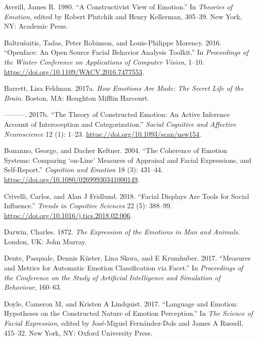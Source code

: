 \documentclass[conference,final,]{IEEEtran}
\begin{document}
\hypertarget{refs}{}
\leavevmode\hypertarget{ref-averill1980constructivist}{}%
Averill, James R. 1980. ``A Constructivist View of Emotion.'' In
\emph{Theories of Emotion}, edited by Robert Plutchik and Henry
Kellerman, 305--39. New York, NY: Academic Press.

\leavevmode\hypertarget{ref-baltruvsaitis2016openface}{}%
Baltrušaitis, Tadas, Peter Robinson, and Louis-Philippe Morency. 2016.
``Openface: An Open Source Facial Behavior Analysis Toolkit.'' In
\emph{Proceedings of the Winter Conference on Applications of Computer
Vision}, 1--10. \url{https://doi.org/10.1109/WACV.2016.7477553}.

\leavevmode\hypertarget{ref-barrett2017emotions}{}%
Barrett, Lisa Feldman. 2017a. \emph{How Emotions Are Made: The Secret
Life of the Brain}. Boston, MA: Houghton Mifflin Harcourt.

\leavevmode\hypertarget{ref-barrett2017theory}{}%
---------. 2017b. ``The Theory of Constructed Emotion: An Active
Inference Account of Interoception and Categorization.'' \emph{Social
Cognitive and Affective Neuroscience} 12 (1): 1--23.
\url{https://doi.org/10.1093/scan/nsw154}.

\leavevmode\hypertarget{ref-bonanno2004brief}{}%
Bonanno, George, and Dacher Keltner. 2004. ``The Coherence of Emotion
Systems: Comparing `on-Line' Measures of Appraisal and Facial
Expressions, and Self-Report.'' \emph{Cognition and Emotion} 18 (3):
431--44. \url{https://doi.org/10.1080/02699930341000149}.

\leavevmode\hypertarget{ref-crivelli2018facial}{}%
Crivelli, Carlos, and Alan J Fridlund. 2018. ``Facial Displays Are Tools
for Social Influence.'' \emph{Trends in Cognitive Sciences} 22 (5):
388--99. \url{https://doi.org/10.1016/j.tics.2018.02.006}.

\leavevmode\hypertarget{ref-darwin1872expression}{}%
Darwin, Charles. 1872. \emph{The Expression of the Emotions in Man and
Animals}. London, UK: John Murray.

\leavevmode\hypertarget{ref-dente2017measures}{}%
Dente, Pasquale, Dennis Küster, Lina Skora, and E Krumhuber. 2017.
``Measures and Metrics for Automatic Emotion Classification via Facet.''
In \emph{Proceedings of the Conference on the Study of Artificial
Intelligence and Simulation of Behaviour}, 160--63.

\leavevmode\hypertarget{ref-doyle2017language}{}%
Doyle, Cameron M, and Kristen A Lindquist. 2017. ``Language and Emotion:
Hypotheses on the Constructed Nature of Emotion Perception.'' In
\emph{The Science of Facial Expression}, edited by José-Miguel
Fernández-Dols and James A Russell, 415--32. New York, NY: Oxford
University Press.
\end{document}
